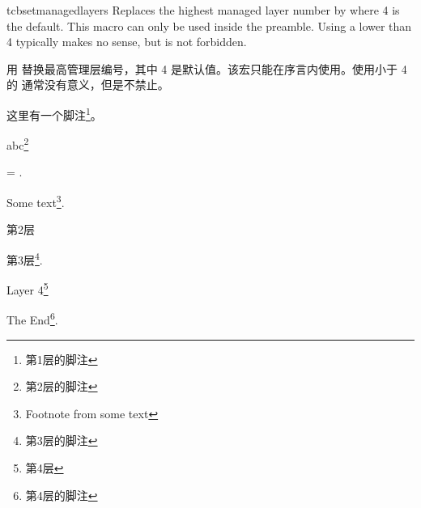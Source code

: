 \begin{docCommand}{tcbsetmanagedlayers}{}
Replaces the highest managed layer number by  where 4 is
the default. This macro can only be used inside the preamble.
Using a  lower than 4 typically makes no sense, but is
not forbidden.

用  替换最高管理层编号，其中 4 是默认值。该宏只能在序言内使用。使用小于 4 的  通常没有意义，但是不禁止。
\end{docCommand}

\begin{tcboutputlisting}
\begin{tcolorbox}[enhanced jigsaw,breakable,title=第1层盒子]
这里有一个脚注\footnote{第1层的脚注}。
\lipsum[2]
\begin{tcolorbox}[title=第2层盒子]
abc\footnote{第2层的脚注}
\end{tcolorbox}
\begin{tcolorbox}[title=Another Box,ams equation]
     = \infty.
\end{tcolorbox}
Some text\footnote{Footnote from some text}.
\begin{tcolorbox}[title=Yet Another Box]%
    第2层
    \tcboxfit[height=2cm]{\lipsum[1]}
    \begin{tcolorbox}
    第3层\footnote{第3层的脚注}. \lipsum[3]
    \begin{tcolorbox}[title=Layer 4,colframe=blue,colback=white]
        Layer 4\footnote{第4层}
    \end{tcolorbox}
    The End\footnote{第4层的脚注}.
    \end{tcolorbox}
\end{tcolorbox}
\end{tcolorbox}
\end{tcboutputlisting}


{\tcbuselistingtext}  